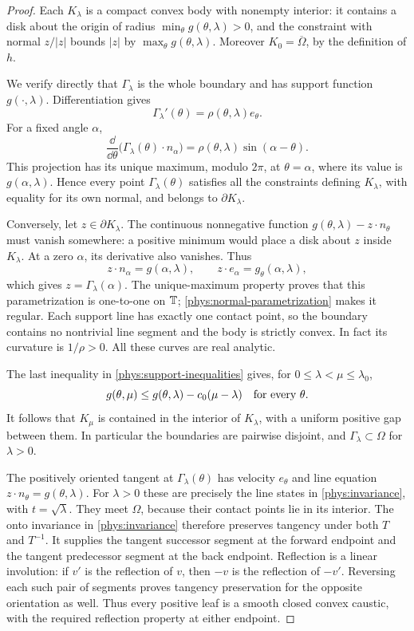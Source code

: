 \begin{proof}
Each \(K_\lambda\) is a compact convex body with nonempty interior:
it contains a disk about the origin of radius
\(\min_\theta g(\theta,\lambda)>0\), and the constraint with normal
\(z/|z|\) bounds \(|z|\) by \(\max_\theta g(\theta,\lambda)\).
Moreover \(K_0=\overline\Omega\), by the definition of \(h\).

We verify directly that \(\Gamma_\lambda\) is the whole boundary and
has support function \(g(\cdot,\lambda)\). Differentiation gives
\begin{equation}\label{phys:normal-parametrization}
 \Gamma_\lambda'(\theta)=\rho(\theta,\lambda)e_\theta.
\end{equation}
For a fixed angle \(\alpha\),
\[
 \frac{\dd}{\dd\theta}
   \bigl(\Gamma_\lambda(\theta)\cdot n_\alpha\bigr)
 =\rho(\theta,\lambda)\sin(\alpha-\theta).
\]
This projection has its unique maximum, modulo \(2\pi\), at
\(\theta=\alpha\), where its value is \(g(\alpha,\lambda)\).
Hence every point \(\Gamma_\lambda(\theta)\) satisfies all the
constraints defining \(K_\lambda\), with equality for its own normal,
and belongs to \(\partial K_\lambda\).

Conversely, let \(z\in\partial K_\lambda\).
The continuous nonnegative function
\(g(\theta,\lambda)-z\cdot n_\theta\) must vanish somewhere: a positive
minimum would place a disk about \(z\) inside \(K_\lambda\).
At a zero \(\alpha\), its derivative also vanishes. Thus
\[
 z\cdot n_\alpha=g(\alpha,\lambda),\qquad
 z\cdot e_\alpha=g_\theta(\alpha,\lambda),
\]
which gives \(z=\Gamma_\lambda(\alpha)\).
The unique-maximum property proves that this parametrization is
one-to-one on \(\mathbb{T}\); \eqref{phys:normal-parametrization} makes it
regular. Each support line has exactly one contact point, so the
boundary contains no nontrivial line segment and the body is strictly
convex. In fact its curvature is \(1/\rho>0\).
All these curves are real analytic.

The last inequality in \eqref{phys:support-inequalities} gives, for
\(0\leq\lambda<\mu\leq\lambda_0\),
\[
 g(\theta,\mu)\leq g(\theta,\lambda)-c_0(\mu-\lambda)
 \quad\hbox{for every }\theta.
\]
It follows that \(K_\mu\) is contained in the interior of \(K_\lambda\),
with a uniform positive gap between them. In particular the boundaries
are pairwise disjoint, and \(\Gamma_\lambda\subset\Omega\) for
\(\lambda>0\).

The positively oriented tangent at \(\Gamma_\lambda(\theta)\) has
velocity \(e_\theta\) and line equation
\(z\cdot n_\theta=g(\theta,\lambda)\).
For \(\lambda>0\) these are precisely the line states in
\eqref{phys:invariance}, with \(t=\sqrt\lambda\).
They meet \(\Omega\), because their contact points lie in its interior.
The onto invariance in \eqref{phys:invariance} therefore preserves
tangency under both \(T\) and \(T^{-1}\). It supplies the tangent
successor segment at the forward endpoint and the tangent predecessor
segment at the back endpoint. Reflection is a linear involution:
if \(v'\) is the reflection of \(v\), then \(-v\) is the reflection
of \(-v'\). Reversing each such pair of segments proves tangency
preservation for the opposite orientation as well. Thus every positive
leaf is a smooth closed convex caustic, with the required reflection
property at either endpoint.


\end{proof}
